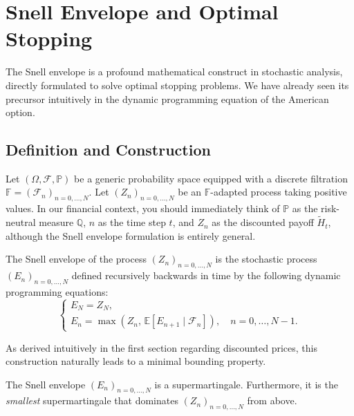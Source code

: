 \chapter{Snell Envelope and Optimal Stopping}

The Snell envelope is a profound mathematical construct in stochastic analysis, directly formulated to solve optimal stopping problems. We have already seen its precursor intuitively in the dynamic programming equation of the American option.

\section{Definition and Construction}

Let $(\Omega, \mathcal{F}, \mathbb{P})$ be a generic probability space equipped with a discrete filtration $\mathbb{F} = (\mathcal{F}_{n})_{n=0, \dots, N}$. Let $(Z_n)_{n=0, \dots, N}$ be an $\mathbb{F}$-adapted process taking positive values. In our financial context, you should immediately think of $\mathbb{P}$ as the risk-neutral measure $\mathbb{Q}$, $n$ as the time step $t$, and $Z_n$ as the discounted payoff $\tilde{H}_t$, although the Snell envelope formulation is entirely general.

\begin{definition}
The Snell envelope of the process $(Z_n)_{n=0, \dots, N}$ is the stochastic process $(E_n)_{n=0, \dots, N}$ defined recursively backwards in time by the following dynamic programming equations:
$$
\begin{cases}
E_N = Z_N, \\
E_n = \max\left( Z_n, \, \mathbb{E}\left[ E_{n+1} \mid \mathcal{F}_n \right] \right), \quad n = 0, \ldots, N-1.
\end{cases}
$$
\end{definition}

As derived intuitively in the first section regarding discounted prices, this construction naturally leads to a minimal bounding property.

\begin{theorem}
The Snell envelope $(E_n)_{n=0, \dots, N}$ is a supermartingale. Furthermore, it is the \textit{smallest} supermartingale that dominates $(Z_n)_{n=0, \dots, N}$ from above.
\end{theorem}

